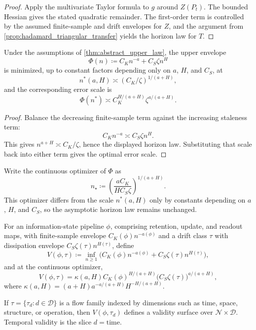 \begin{proof}
Apply the multivariate Taylor formula to $g$ around $Z(P_t)$. The bounded Hessian
gives the stated quadratic remainder. The first-order term is controlled by the
assumed finite-sample and drift envelopes for $Z$, and the argument from
\cref{prop:hadamard_triangular_transfer} yields the horizon law for $T$.
\end{proof}

\begin{corollary}
\label{cor:temporal_validity_horizon}
Under the assumptions of \cref{thm:abstract_upper_law}, the upper envelope
\[
  \Phi(n) \coloneqq C_K n^{-a} + C_S\zeta n^H
\]
is minimized, up to constant factors depending only on $a$, $H$, and $C_S$, at
\[
  n^*(a,H) \asymp (C_K/\zeta)^{1/(a+H)},
\]
and the corresponding error scale is
\[
  \Phi(n^*) \asymp C_K^{H/(a+H)}\zeta^{a/(a+H)}.
\]
\end{corollary}

\begin{proof}
Balance the decreasing finite-sample term against the increasing staleness term:
\[
  C_K n^{-a} \asymp C_S\zeta n^H.
\]
This gives $n^{a+H}\asymp C_K/\zeta$, hence the displayed horizon law. Substituting
that scale back into either term gives the optimal error scale.
\end{proof}

Write the continuous optimizer of $\Phi$ as
\[
  n_\star \coloneqq \left(\frac{aC_K}{H C_S\zeta}\right)^{1/(a+H)}.
\]
This optimizer differs from the scale $n^*(a,H)$ only by constants depending on
$a$, $H$, and $C_S$, so the asymptotic horizon law remains unchanged.

\begin{definition}
For an information-state pipeline $\phi$, comprising retention, update, and
readout maps, with finite-sample envelope
$C_K(\phi)n^{-a(\phi)}$ and a drift class $\tau$ with dissipation envelope
$C_S\zeta(\tau)n^{H(\tau)}$, define
\[
  V(\phi,\tau)
  \coloneqq
  \inf_{n\ge 1}\bigl(C_K(\phi)n^{-a(\phi)} + C_S\zeta(\tau)n^{H(\tau)}\bigr),
\]
and at the continuous optimizer,
\[
  V(\phi,\tau)
  = \kappa(a,H) C_K(\phi)^{H/(a+H)}\bigl(C_S\zeta(\tau)\bigr)^{a/(a+H)},
\]
where $\kappa(a,H)=(a+H)a^{-a/(a+H)}H^{-H/(a+H)}$.
\end{definition}

\begin{remark}
If $\tau=\{\tau_d:d\in\mathcal D\}$ is a flow family indexed by dimensions such as
time, space, structure, or operation, then $V(\phi,\tau_d)$ defines a validity
surface over $\mathcal N\times\mathcal D$. Temporal validity is the slice
$d=\mathrm{time}$.
\end{remark}


